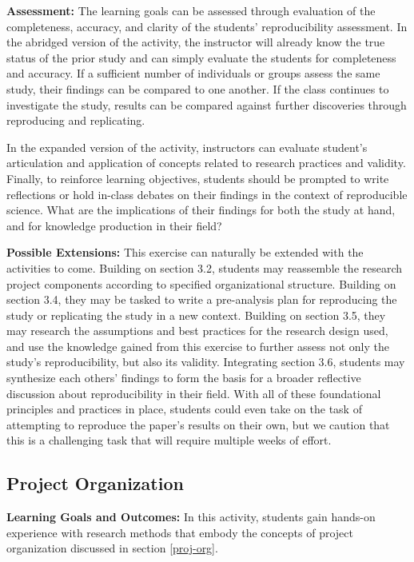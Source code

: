\documentclass[
  12pt]{article}
\begin{document}
\textbf{Assessment:} The learning goals can be assessed through evaluation of the completeness, accuracy, and clarity of the students' reproducibility assessment. 
In the abridged version of the activity, the instructor will already know the true status of the prior study and can simply evaluate the students for completeness and accuracy.
If a sufficient number of individuals or groups assess the same study, their findings can be compared to one another.
If the class continues to investigate the study, results can be compared against further discoveries through reproducing and replicating. 

In the expanded version of the activity, instructors can evaluate student's articulation and application of concepts related to research practices and validity. 
Finally, to reinforce learning objectives, students should be prompted to write reflections or hold in-class debates on their findings in the context of reproducible science. 
What are the implications of their findings for both the study at hand, and for knowledge production in their field? 

\textbf{Possible Extensions:}
This exercise can naturally be extended with the activities to come.
Building on section 3.2, students may reassemble the research project components according to specified organizational structure.
Building on section 3.4, they may be tasked to write a pre-analysis plan for reproducing the study or replicating the study in a new context. 
Building on section 3.5, they may research the assumptions and best practices for the research design used, and use the knowledge gained from this exercise to further assess not only the study's reproducibility, but also its validity. 
Integrating section 3.6, students may synthesize each others' findings to form the basis for a broader reflective discussion about reproducibility in their field.
With all of these foundational principles and practices in place, students could even take on the task of attempting to reproduce the paper's results on their own, but we caution that this is a challenging task \citep{vilh:2022} that will require multiple weeks of effort.

\subsection{Project Organization} \label{sec-organize}

\textbf{Learning Goals and Outcomes:} In this activity, students gain hands-on experience with research methods that embody the concepts of project organization discussed in section \ref{proj-org}.  
\end{document}
